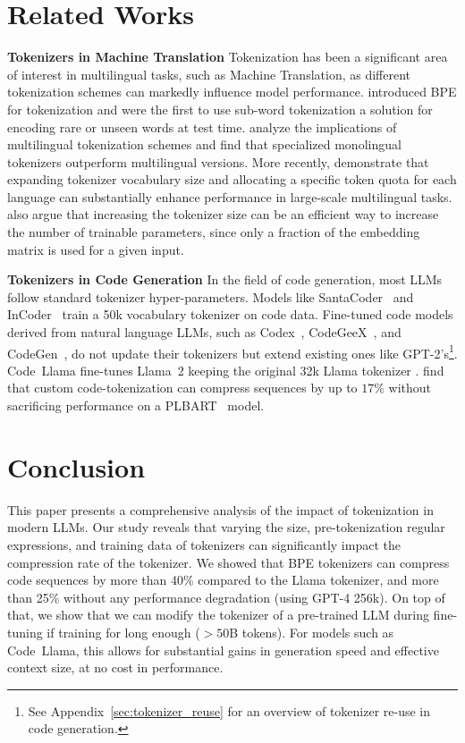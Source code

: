 \section{Related Works}

\textbf{Tokenizers in Machine Translation} Tokenization has been a significant area of interest in multilingual tasks, such as Machine Translation, as different tokenization schemes can markedly influence model performance.
\citet{sennrich-etal-2016-neural} introduced BPE for tokenization and were the first to use sub-word tokenization a solution for encoding rare or unseen words at test time.
\citet{rust-etal-2021-good} analyze the implications of multilingual tokenization schemes and find that specialized monolingual tokenizers outperform multilingual versions. More recently, \citet{Liang2023XLMVOT} demonstrate that expanding tokenizer vocabulary size and allocating a specific token quota for each language can substantially enhance performance in large-scale multilingual tasks.
\citet{Liang2023XLMVOT} also argue that increasing the tokenizer size can be an efficient way to increase the number of trainable parameters, since only a fraction of the embedding matrix is used for a given input.

\textbf{Tokenizers in Code Generation} In the field of code generation, most LLMs follow standard tokenizer hyper-parameters. Models like SantaCoder~\citep{santacoder} and InCoder~\citep{incoder} train a 50k vocabulary tokenizer on code data. Fine-tuned code models derived from natural language LLMs, such as Codex~\cite{humaneval}, CodeGeeX~\citep{CodeGeeX}, and CodeGen~\citep{Nijkamp_Pang_Hayashi_Tu_Wang_Zhou_Savarese_Xiong_2023}, do not update their tokenizers but extend existing ones like GPT-2’s\footnote{See Appendix~\ref{sec:tokenizer_reuse} for an overview of tokenizer re-use in code generation.}. Code~Llama \cite{roziere2023code} fine-tunes Llama~2 \cite{touvron2023llama2} keeping the original 32k Llama tokenizer \cite{touvron2023llama}.
\citet{Chirkova_Troshin_2022} find that custom code-tokenization can compress sequences by up to $17\%$ without sacrificing performance on a PLBART~\cite{PLBART} model.

\section{Conclusion}

This paper presents a comprehensive analysis of the impact of tokenization in modern LLMs. Our study reveals that varying the size, pre-tokenization regular expressions, and training data of tokenizers can significantly impact the compression rate of the tokenizer. We showed that BPE tokenizers can compress code sequences by more than 40\% compared to the Llama tokenizer, and more than 25\% without any performance degradation (using GPT-4 256k). On top of that, we show that we can modify the tokenizer of a pre-trained LLM during fine-tuning if training for long enough ($>50$B tokens). For models such as Code~Llama, this allows for substantial gains in generation speed and effective context size, at no cost in performance.

